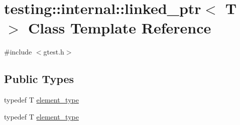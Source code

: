\hypertarget{classtesting_1_1internal_1_1linked__ptr}{\section{testing\-:\-:internal\-:\-:linked\-\_\-ptr$<$ T $>$ Class Template Reference}
\label{classtesting_1_1internal_1_1linked__ptr}
}


{\ttfamily \#include $<$gtest.\-h$>$}

\subsection*{Public Types}
\begin{DoxyCompactItemize}
\item 
typedef T \hyperlink{classtesting_1_1internal_1_1linked__ptr_a295c7d1ee4100d916514c4e4385a0063}{element\-\_\-type}
\item 
typedef T \hyperlink{classtesting_1_1internal_1_1linked__ptr_a295c7d1ee4100d916514c4e4385a0063}{element\-\_\-type}
\end{DoxyCompactItemize}
